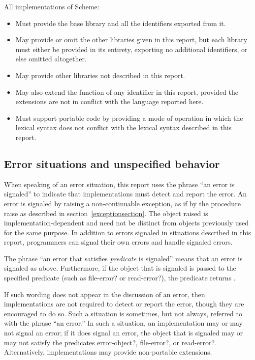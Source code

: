 All implementations of Scheme:
\begin{itemize}

\item Must provide the base library and all the identifiers
exported from it.

\item May provide or omit the other
libraries given in this report, but each library must either be provided
in its entirety, exporting no additional identifiers, or else omitted
altogether.

\item May provide other libraries not described in this report.

\item May also extend the function of any identifier in this
report, provided the extensions are not in conflict with the language
reported here.

\item Must support portable
code by providing a mode of operation in which the lexical syntax does
not conflict with the lexical syntax described in this report.
\end{itemize}

\subsection{Error situations and unspecified behavior}
\label{errorsituations}

When speaking of an error situation, this report uses the phrase ``an
error is signaled'' to indicate that implementations must detect and
report the error.
An error is signaled by raising a non-continuable exception, as if by
the procedure {\cf raise} as described in section~\ref{exceptionsection}.  The object raised is implementation-dependent
and need not be distinct from objects previously used for the same purpose.
In addition to errors signaled in situations described in this
report, programmers can signal their own errors and handle signaled errors.

The phrase ``an error that satisfies {\em predicate} is signaled'' means that an error is
signaled as above.  Furthermore, if the object that is signaled is
passed to the specified predicate (such as {\cf file-error?} or {\cf
read-error?}), the predicate returns \schtrue{}.

\vest If such wording does not appear in the discussion of
an error, then implementations are not required to detect or report the
error, though they are encouraged to do so.
Such a situation is sometimes, but not always, referred to with the phrase
``an error.''
In such a situation, an implementation may or may not signal an error;
if it does signal an error, the object that is signaled may or may not
satisfy the predicates {\cf error-object?}, {\cf file-error?}, or
{\cf read-error?}.
Alternatively, implementations may provide non-portable extensions.

